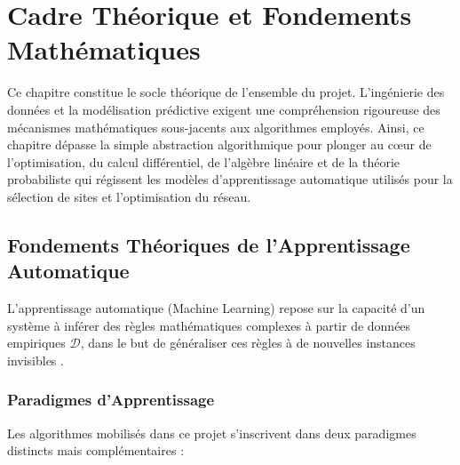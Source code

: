 \documentclass[11pt,a4paper,twoside]{report}
\begin{document}
\FloatBarrier




\chapter{Cadre Théorique et Fondements Mathématiques}

Ce chapitre constitue le socle théorique de l'ensemble du projet. L'ingénierie des données et la modélisation prédictive exigent une compréhension rigoureuse des mécanismes mathématiques sous-jacents aux algorithmes employés. Ainsi, ce chapitre dépasse la simple abstraction algorithmique pour plonger au cœur de l'optimisation, du calcul différentiel, de l'algèbre linéaire et de la théorie probabiliste qui régissent les modèles d'apprentissage automatique utilisés pour la sélection de sites et l'optimisation du réseau.

\section{Fondements Théoriques de l'Apprentissage Automatique}

L'apprentissage automatique (Machine Learning) repose sur la capacité d'un système à inférer des règles mathématiques complexes à partir de données empiriques $\mathcal{D}$, dans le but de généraliser ces règles à de nouvelles instances invisibles \cite{mitchell1997}.

\subsection{Paradigmes d'Apprentissage}

Les algorithmes mobilisés dans ce projet s'inscrivent dans deux paradigmes distincts mais complémentaires :
\end{document}
